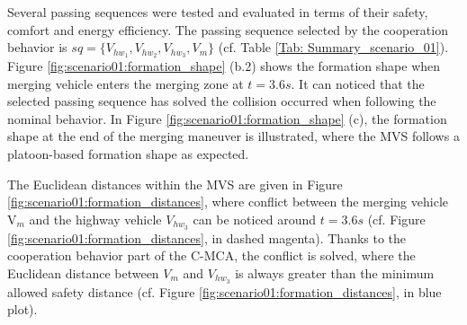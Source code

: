 Several passing sequences were tested and evaluated in terms of their safety, comfort and energy efficiency. The passing sequence selected by the cooperation behavior is $sq=\{V_{hw_1}, V_{hw_2}, V_{hw_3}, V_{m}\}$ (cf. Table \ref{Tab: Summary_scenario_01}). Figure \ref{fig:scenario01:formation_shape} (b.2) shows the formation shape when merging vehicle enters the merging zone at $t=3.6s$. It can noticed that the selected passing sequence has solved the collision occurred when following the nominal behavior. In Figure \ref{fig:scenario01:formation_shape} (c), the formation shape at the end of the merging maneuver is illustrated, where the MVS follows a platoon-based formation shape as expected. 









  














 

The Euclidean distances within the MVS are given in Figure \ref{fig:scenario01:formation_distances}, where conflict between the merging vehicle V$_m$  and the highway vehicle $V_{hw_3}$ can be noticed around $t=3.6s$ (cf. Figure \ref{fig:scenario01:formation_distances}, in dashed magenta). Thanks to the cooperation behavior part of the C-MCA, the conflict is solved, where the Euclidean distance between $V_m$ and $V_{hw_3}$ is always greater than the minimum allowed safety distance (cf. Figure \ref{fig:scenario01:formation_distances}, in blue plot). 

